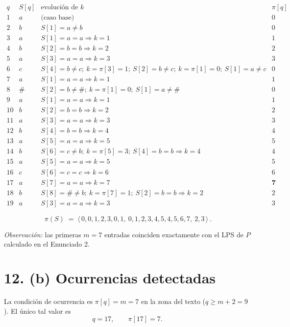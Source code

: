 \documentclass[11pt]{article}
\begin{document}
\[
\begin{array}{c|c|c|c}
q & S[q] & \text{evolución de } k & \pi[q]\\\hline
1 & a & \text{(caso base)} & 0\\
2 & b & S[1]{=}a \neq b & 0\\
3 & a & S[1]{=}a = a \Rightarrow k=1 & 1\\
4 & b & S[2]{=}b = b \Rightarrow k=2 & 2\\
5 & a & S[3]{=}a = a \Rightarrow k=3 & 3\\
6 & c & S[4]{=}b\neq c;\ k=\pi[3]{=}1;\ S[2]{=}b\neq c;\ k=\pi[1]{=}0;\ S[1]{=}a\neq c & 0\\
7 & a & S[1]{=}a = a \Rightarrow k=1 & 1\\
8 & \# & S[2]{=}b\neq\#;\ k=\pi[1]{=}0;\ S[1]{=}a\neq\# & 0\\
9 & a & S[1]{=}a = a \Rightarrow k=1 & 1\\
10 & b & S[2]{=}b = b \Rightarrow k=2 & 2\\
11 & a & S[3]{=}a = a \Rightarrow k=3 & 3\\
12 & b & S[4]{=}b = b \Rightarrow k=4 & 4\\
13 & a & S[5]{=}a = a \Rightarrow k=5 & 5\\
14 & b & S[6]{=}c\neq b;\ k=\pi[5]{=}3;\ S[4]{=}b = b \Rightarrow k=4 & 4\\
15 & a & S[5]{=}a = a \Rightarrow k=5 & 5\\
16 & c & S[6]{=}c = c \Rightarrow k=6 & 6\\
17 & a & S[7]{=}a = a \Rightarrow k=7 & \mathbf{7}\\
18 & b & S[8]{=}\#\neq b;\ k=\pi[7]{=}1;\ S[2]{=}b = b \Rightarrow k=2 & 2\\
19 & a & S[3]{=}a = a \Rightarrow k=3 & 3
\end{array}
\]

\[
\boxed{\ \pi(S) \;=\; \langle\,0,0,1,2,3,0,1,\ 0,1,2,3,4,5,4,5,6,7,\ 2,3\,\rangle\ }.
\]

\emph{Observación:} las primeras \(m=7\) entradas coinciden exactamente con el LPS de \(P\) calculado en el Enunciado 2.

\section*{12. (b) Ocurrencias detectadas}

La condición de ocurrencia es \(\pi[q]=m=7\) en la zona del texto (\(q\ge m+2=9\)). El único tal valor es
\[
q = 17, \qquad \pi[17] = 7.
\]
\end{document}
